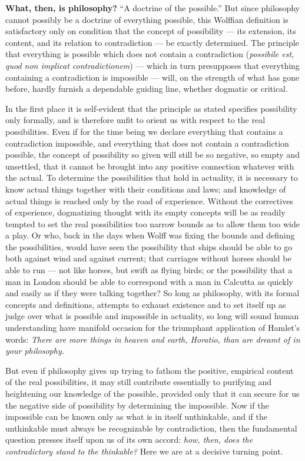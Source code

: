 \documentclass[12pt,a4paper]{book}
\begin{document}
\textbf{What, then, is philosophy?} ``A doctrine of the possible.'' But since
philosophy cannot possibly be a doctrine of everything possible, this Wolffian
definition is satisfactory only on condition that the concept of possibility
--- its extension, its content, and its relation to contradiction --- be
exactly determined. The principle that everything is possible which does not
contain a contradiction (\textit{possibile est, quod non implicat
contradictionem}) --- which in turn presupposes that everything containing a
contradiction is impossible --- will, on the strength of what has gone before,
hardly furnish a dependable guiding line, whether dogmatic or critical.

In the first place it is self-evident that the principle as stated specifies
possibility only formally, and is therefore unfit to orient us with respect to
the real possibilities. Even if for the time being we declare everything that
contains a contradiction impossible, and everything that does not contain a
contradiction possible, the concept of possibility so given will still be so
negative, so empty and unsettled, that it cannot be brought into any positive
connection whatever with the actual. To determine the possibilities that hold
in actuality, it is necessary to know actual things together with their
conditions and laws; and knowledge of actual things is reached only by the road
of experience. Without the correctives of experience, dogmatizing thought with
its empty concepts will be as readily tempted to set the real possibilities too
narrow bounds as to allow them too wide a play. Or who, back in the days when
Wolff was fixing the bounds and defining the possibilities, would have seen the
possibility that ships should be able to go both against wind and against
current; that carriages without horses should be able to run --- not like
horses, but swift as flying birds; or the possibility that a man in London
should be able to correspond with a man in Calcutta as quickly and easily as if
they were talking together? So long as philosophy, with its formal concepts and
definitions, attempts to exhaust existence and to set itself up as judge over
what is possible and impossible in actuality, so long will sound human
understanding have manifold occasion for the triumphant application of Hamlet's
words: \textit{There are more things in heaven and earth, Horatio, than are
dreamt of in your philosophy.}

But even if philosophy gives up trying to fathom the positive, empirical
content of the real possibilities, it may
still contribute essentially to purifying and heightening our knowledge of the
possible, provided only that it can secure for us the negative side of
possibility by determining the impossible. Now if the impossible can be known
only as what is in itself unthinkable, and if the unthinkable must always be
recognizable by contradiction, then the fundamental question presses itself
upon us of its own accord: \emph{how, then, does the contradictory stand to the
thinkable?} Here we are at a decisive turning point.
\end{document}
